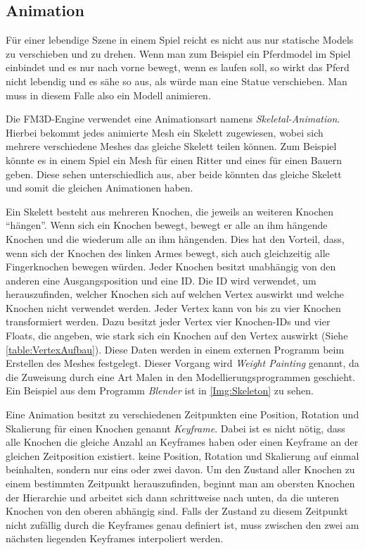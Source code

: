 \subsection{Animation}

Für einer lebendige Szene in einem Spiel reicht es nicht aus nur statische Models zu verschieben und zu drehen. Wenn man zum Beispiel ein Pferdmodel im Spiel einbindet und es nur nach vorne bewegt, wenn es laufen soll, so wirkt das Pferd nicht lebendig und es sähe so aus, als würde man eine Statue verschieben. Man muss in diesem Falle also ein Modell animieren.

Die FM3D-Engine verwendet eine Animationsart namens \textit{Skeletal-Animation}. Hierbei bekommt jedes animierte Mesh ein Skelett zugewiesen, wobei sich mehrere verschiedene Meshes das gleiche Skelett teilen können. Zum Beispiel könnte es in einem Spiel ein Mesh für einen Ritter und eines für einen Bauern geben. Diese sehen unterschiedlich aus, aber beide könnten das gleiche Skelett und somit die gleichen Animationen haben.

Ein Skelett besteht aus mehreren Knochen, die jeweils an weiteren Knochen "`hängen"'. Wenn sich ein Knochen bewegt, bewegt er alle an ihm hängende Knochen und die wiederum alle an ihm hängenden. 
Dies hat den Vorteil, dass, wenn sich der Knochen des linken Armes bewegt, sich auch gleichzeitig alle Fingerknochen bewegen würden. Jeder Knochen besitzt unabhängig von den anderen eine Ausgangsposition und eine ID.
Die ID wird verwendet, um herauszufinden, welcher Knochen sich auf welchen Vertex auswirkt und welche Knochen nicht verwendet werden. Jeder Vertex kann von bis zu vier Knochen transformiert werden. Dazu besitzt jeder Vertex vier Knochen-IDs und vier Floats, die angeben, wie stark sich ein Knochen auf den Vertex auswirkt (Siehe \cref{table:VertexAufbau}). Diese Daten werden in einem externen Programm beim Erstellen des Meshes festgelegt. Dieser Vorgang wird \textit{Weight Painting} genannt, da die Zuweisung durch eine Art Malen in den Modellierungsprogrammen geschieht. Ein Beispiel aus dem Programm \textit{Blender} ist in \cref{Img:Skeleton} zu sehen.

Eine Animation besitzt zu verschiedenen Zeitpunkten eine Position, Rotation und Skalierung für einen Knochen genannt \textit{Keyframe}. Dabei ist es nicht nötig, dass alle Knochen die gleiche Anzahl an Keyframes haben oder einen Keyframe an der gleichen Zeitposition existiert. keine Position, Rotation und Skalierung auf einmal beinhalten, sondern nur eins oder zwei davon. Um den Zustand aller Knochen zu einem bestimmten Zeitpunkt herauszufinden, beginnt man am obersten Knochen der Hierarchie und arbeitet sich dann schrittweise nach unten, da die unteren Knochen von den oberen abhängig sind. 
Falls der Zustand zu diesem Zeitpunkt nicht zufällig durch die Keyframes genau definiert ist, muss zwischen den zwei am nächsten liegenden Keyframes interpoliert werden.

